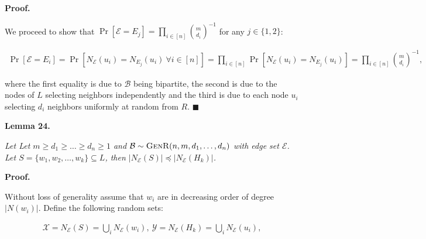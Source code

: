 \documentclass[10pt,a4paper]{article}
\begin{document}



\par\medskip\noindent\textbf{Proof.}\par



We proceed to show that $\Pr[\mathcal{E}=E_{j}]=\prod_{i\in[n]}\binom{m}{d_{i}}^{-1}$ for any $j\in\{1,2\}$:\par


\[\begin{gathered}
\displaystyle\Pr[\mathcal{E}=E_{i}]=\Pr[N_{\mathcal{E}}(u_{i})=N_{E_{j}}(u_{i})\ \forall i\in[n]]=\prod_{i\in[n]}{\Pr[N_{\mathcal{E}}(u_{i})=N_{E_{j}}(u_{i})]}=\prod_{i\in[n]}{\binom{m}{d_{i}}^{-1}},
\end{gathered}\]


where the first equality is due to $\mathcal{B}$ being bipartite, the second is due to the nodes of $L$ selecting neighbors independently and the third is due to each node $u_{i}$ selecting $d_{i}$ neighbors uniformly at random from $R$.
\ensuremath{\blacksquare}\par






\par\medskip\noindent\textbf{\textbf{Lemma 24}\textbf{.}}\par



\emph{Let Let $m\geq d_{1}\geq\dots\geq d_{n}\geq 1$ and $\mathcal{B}\sim\textsc{GenR}(n,m,d_{1},\dots,d_{n})$ with edge set $\mathcal{E}$.
Let $S=\{w_{1},w_{2},\dots,w_{k}\}\subseteq L$, then $|N_{\mathcal{E}}(S)|\preccurlyeq|N_{\mathcal{E}}(H_{k})|$.}\par






\par\medskip\noindent\textbf{Proof.}\par



Without loss of generality assume that $w_{i}$ are in decreasing order of degree $|N(w_{i})|$.
Define the following random sets:\par


\[\begin{gathered}
\displaystyle\mathcal{X}=N_{\mathcal{E}}(S)=\bigcup_{i}N_{\mathcal{E}}(w_{i}),\ \mathcal{Y}=N_{\mathcal{E}}(H_{k})=\bigcup_{i}N_{\mathcal{E}}(u_{i}),
\end{gathered}\]
\end{document}
